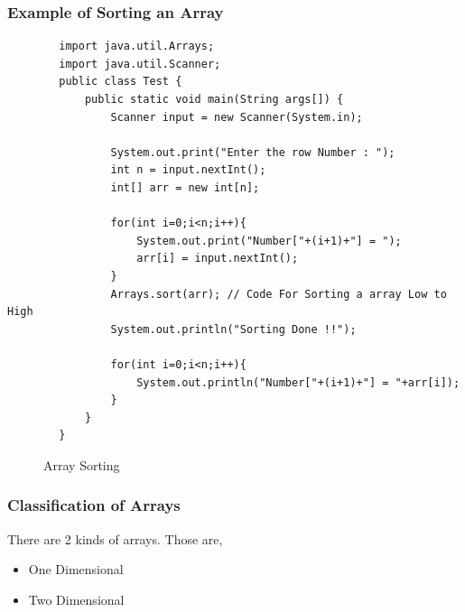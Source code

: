 \documentclass[openany]{book}  %
\begin{document}
\subsubsection{Example of Sorting an Array}
\begin{center}
    \begin{verbatim}
        import java.util.Arrays;
        import java.util.Scanner;
        public class Test {
            public static void main(String args[]) {
                Scanner input = new Scanner(System.in);
        
                System.out.print("Enter the row Number : ");
                int n = input.nextInt();
                int[] arr = new int[n];
                
                for(int i=0;i<n;i++){
                    System.out.print("Number["+(i+1)+"] = ");
                    arr[i] = input.nextInt();
                }
                Arrays.sort(arr); // Code For Sorting a array Low to High
                System.out.println("Sorting Done !!");
        
                for(int i=0;i<n;i++){
                    System.out.println("Number["+(i+1)+"] = "+arr[i]);
                }
            }
        }
    \end{verbatim}
\end{center}
% 
% 
\begin{figure}[htbp]
    \begin{center}
        \caption{Array Sorting\cite{Ref3}}
    \end{center}
\end{figure}
% 
% 
\subsubsection{Classification of Arrays}
There are 2 kinds of arrays. Those are,
\begin{itemize}
    \item One Dimensional
    \item Two Dimensional
\end{itemize}
% 
% 
\end{document}
